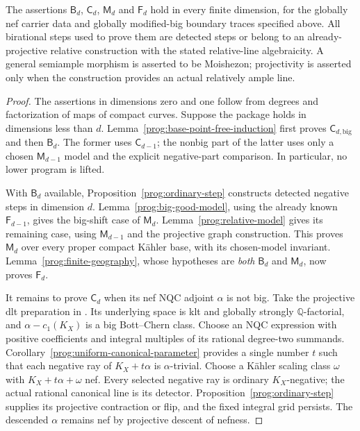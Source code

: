 

\begin{theorem}
\label{prog:restricted-package}
The assertions $\mathsf B_d$, $\mathsf C_d$, $\mathsf M_d$ and
$\mathsf F_d$ hold in every finite dimension, for the globally nef
carrier data and globally modified-big boundary traces specified above.
All birational steps used to prove them are detected steps or belong
to an already-projective relative construction with the stated
relative-line algebraicity. A general semiample morphism is asserted
to be Moishezon; projectivity is asserted only when the construction
provides an actual relatively ample line.
\end{theorem}
\begin{proof}
The assertions in dimensions zero and one follow from degrees and
factorization of maps of compact curves. Suppose the package holds
in dimensions less than $d$. Lemma~\ref{prog:base-point-free-induction}
first proves $\mathsf C_{d,\mathrm{big}}$ and then $\mathsf B_d$.
The former uses $\mathsf C_{d-1}$; the nonbig part of the latter
uses only a chosen $\mathsf M_{d-1}$ model and the explicit
negative-part comparison. In particular, no lower program is lifted.

With $\mathsf B_d$ available, Proposition~\ref{prog:ordinary-step}
constructs detected negative steps in dimension $d$.
Lemma~\ref{prog:big-good-model}, using the already known
$\mathsf F_{d-1}$, gives the big-shift case of $\mathsf M_d$.
Lemma~\ref{prog:relative-model} gives its remaining case, using
$\mathsf M_{d-1}$ and the projective graph construction. This proves
$\mathsf M_d$ over every proper compact K\"ahler base, with its
chosen-model invariant. Lemma~\ref{prog:finite-geography}, whose
hypotheses are \emph{both} $\mathsf B_d$ and $\mathsf M_d$, now
proves $\mathsf F_d$.

It remains to prove $\mathsf C_d$ when its nef NQC adjoint $\alpha$
is not big. Take the projective dlt preparation in
\cite[Section~6]{HX}. Its underlying space is klt and globally
strongly $\mathbb Q$-factorial, and
$\alpha-c_1(K_X)$ is a big Bott--Chern class. Choose an NQC
expression with positive coefficients and integral multiples of its
rational degree-two summands. Corollary~\ref{prog:uniform-canonical-parameter}
provides a single number $t$ such that each negative ray of
$K_X+t\alpha$ is $\alpha$-trivial. Choose a K\"ahler scaling class
$\omega$ with $K_X+t\alpha+\omega$ nef. Every selected negative
ray is ordinary $K_X$-negative; the actual rational canonical line
is its detector. Proposition~\ref{prog:ordinary-step} supplies its
projective contraction or flip, and the fixed integral grid persists.
The descended $\alpha$ remains nef by projective descent of nefness.


\end{proof}
